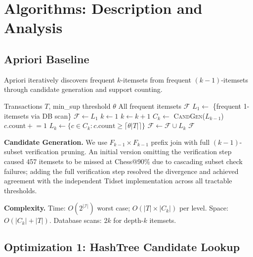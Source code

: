 \documentclass[conference]{IEEEtran}
\begin{document}
\section{Algorithms: Description and Analysis}

\subsection{Apriori Baseline}

Apriori \cite{agrawal1994} iteratively discovers frequent $k$-itemsets
from frequent $(k-1)$-itemsets through candidate generation and support
counting.

\begin{algorithm}[H]
\caption{Apriori Baseline}
\begin{algorithmic}[1]
\Require Transactions $T$, min\_sup threshold $\theta$
\Ensure All frequent itemsets $\mathcal{F}$
\State $L_1 \leftarrow$ \{frequent 1-itemsets via DB scan\}
\State $\mathcal{F} \leftarrow L_1$
\State $k \leftarrow 1$
  \State $k \leftarrow k + 1$
  \State $C_k \leftarrow$ \textsc{CandGen}($L_{k-1}$)
      \State $c.\text{count} \mathrel{+}= 1$
    \EndFor
  \EndFor
  \State $L_k \leftarrow \{c \in C_k : c.\text{count} \geq \lceil\theta|T|\rceil\}$
  \State $\mathcal{F} \leftarrow \mathcal{F} \cup L_k$
\EndWhile
\Return $\mathcal{F}$
\end{algorithmic}
\end{algorithm}

\noindent\textbf{Candidate Generation.}
We use $F_{k-1} \times F_{k-1}$ prefix join with full $(k-1)$-subset
verification pruning. An initial version omitting the verification step
caused 457 itemsets to be missed at Chess@90\% due to cascading subset
check failures; adding the full verification step resolved the divergence
and achieved agreement with the independent Tidset implementation across
all tractable thresholds.

\noindent\textbf{Complexity.}
Time: $O(2^{|\mathcal{I}|})$ worst case; $O(|T| \times |C_k|)$ per
level. Space: $O(|C_k| + |T|)$. Database scans: $2k$ for depth-$k$
itemsets.

\subsection{Optimization 1: HashTree Candidate Lookup}
\end{document}
